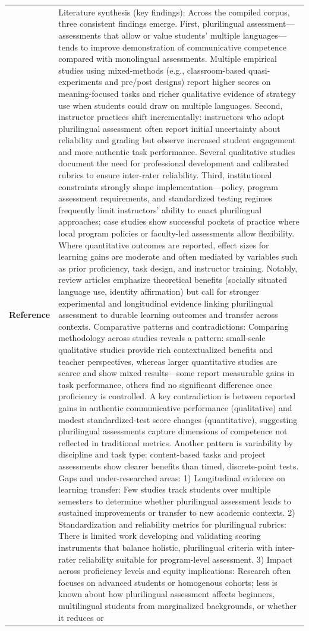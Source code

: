 \begin{longtable}{@{}l p{13cm}@{}}
  \textbf{Reference} & Literature synthesis (key findings): Across the compiled corpus, three consistent findings emerge. First, plurilingual assessment---assessments that allow or value students' multiple languages---tends to improve demonstration of communicative competence compared with monolingual assessments. Multiple empirical studies using mixed-methods (e.g., classroom-based quasi-experiments and pre/post designs) report higher scores on meaning-focused tasks and richer qualitative evidence of strategy use when students could draw on multiple languages. Second, instructor practices shift incrementally: instructors who adopt plurilingual assessment often report initial uncertainty about reliability and grading but observe increased student engagement and more authentic task performance. Several qualitative studies document the need for professional development and calibrated rubrics to ensure inter-rater reliability. Third, institutional constraints strongly shape implementation---policy, program assessment requirements, and standardized testing regimes frequently limit instructors' ability to enact plurilingual approaches; case studies show successful pockets of practice where local program policies or faculty-led assessments allow flexibility. Where quantitative outcomes are reported, effect sizes for learning gains are moderate and often mediated by variables such as prior proficiency, task design, and instructor training. Notably, review articles emphasize theoretical benefits (socially situated language use, identity affirmation) but call for stronger experimental and longitudinal evidence linking plurilingual assessment to durable learning outcomes and transfer across contexts. Comparative patterns and contradictions: Comparing methodology across studies reveals a pattern: small-scale qualitative studies provide rich contextualized benefits and teacher perspectives, whereas larger quantitative studies are scarce and show mixed results---some report measurable gains in task performance, others find no significant difference once proficiency is controlled. A key contradiction is between reported gains in authentic communicative performance (qualitative) and modest standardized-test score changes (quantitative), suggesting plurilingual assessments capture dimensions of competence not reflected in traditional metrics. Another pattern is variability by discipline and task type: content-based tasks and project assessments show clearer benefits than timed, discrete-point tests. Gaps and under-researched areas: 1) Longitudinal evidence on learning transfer: Few studies track students over multiple semesters to determine whether plurilingual assessment leads to sustained improvements or transfer to new academic contexts. 2) Standardization and reliability metrics for plurilingual rubrics: There is limited work developing and validating scoring instruments that balance holistic, plurilingual criteria with inter-rater reliability suitable for program-level assessment. 3) Impact across proficiency levels and equity implications: Research often focuses on advanced students or homogenous cohorts; less is known about how plurilingual assessment affects beginners, multilingual students from marginalized backgrounds, or whether it reduces or 
\end{longtable}
